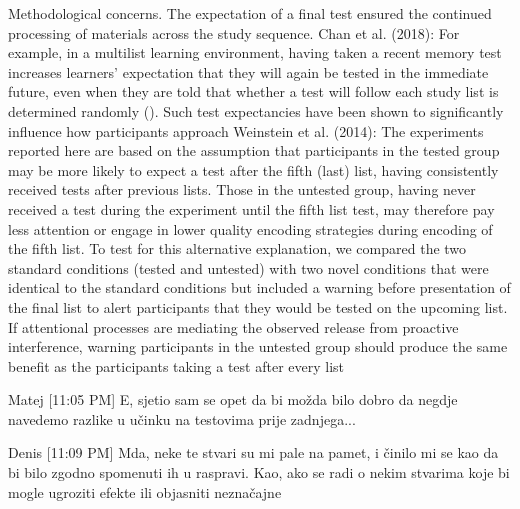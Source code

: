 \documentclass[../main.tex]{subfiles}
\begin{document}
Methodological concerns. The expectation of a final test ensured the
continued processing of materials across the study sequence.
Chan et al. (2018): %
For example, in a multilist learning environment, having taken a
recent memory test increases learners’ expectation that they will
again be tested in the immediate future, even when they are told
that whether a test will follow each study list is determined
randomly (\cite{weinsteinRoleTestExpectancy2014}). Such test expectancies have
been shown to significantly influence how participants approach
Weinstein et al. (2014):
The experiments reported here are based on the assumption that
participants in the tested group may be more likely to expect a test
after the fifth (last) list, having consistently received tests after
previous lists. Those in the untested group, having never received
a test during the experiment until the fifth list test, may therefore
pay less attention or engage in lower quality encoding strategies
during encoding of the fifth list. To test for this alternative explanation, 
we compared the two standard conditions (tested and
untested) with two novel conditions that were identical to the
standard conditions but included a warning before presentation of
the final list to alert participants that they would be tested on the
upcoming list. If attentional processes are mediating the observed
release from proactive interference, warning participants in the
untested group should produce the same benefit as the participants
taking a test after every list


Matej [11:05 PM]
E, sjetio sam se opet da bi možda bilo dobro da negdje navedemo razlike u učinku na testovima prije zadnjega...

Denis [11:09 PM]
Mda, neke te stvari su mi pale na pamet, i činilo mi se kao da bi bilo zgodno spomenuti ih u raspravi. Kao, ako se radi o nekim stvarima koje bi mogle ugroziti efekte ili objasniti neznačajne
\end{document}
